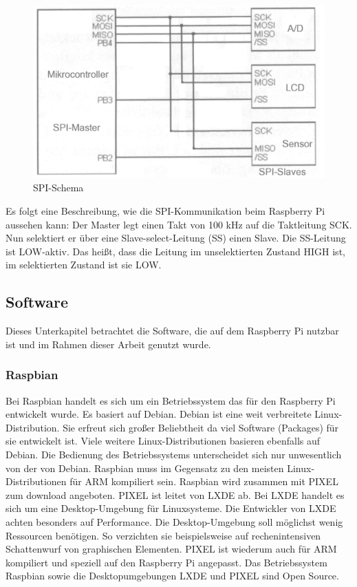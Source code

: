 \begin{figure}[h!] 
\includegraphics[scale=0.3]{bilder/spi}
\caption[SPI Schema]{SPI-Schema \cite{dembowski2015raspberry}}
\label{spi}
\end{figure}

Es folgt eine Beschreibung, wie die \ac{SPI}-Kommunikation beim Raspberry Pi aussehen kann: Der Master legt einen Takt von 100 kHz auf die Taktleitung SCK. Nun selektiert er über eine Slave-select-Leitung (SS) einen Slave. Die SS-Leitung ist LOW-aktiv. Das heißt, dass die Leitung im unselektierten Zustand HIGH ist, im selektierten Zustand ist sie LOW. 

 \cite{dembowski2015raspberry} \cite{lehmann}

 
\subsection{Software}
Dieses Unterkapitel betrachtet die Software, die auf dem Raspberry Pi nutzbar ist und im Rahmen dieser Arbeit genutzt wurde.
\subsubsection{Raspbian}
Bei Raspbian handelt es sich um ein Betriebssystem das für den Raspberry Pi entwickelt wurde. Es basiert auf Debian. Debian ist eine weit verbreitete Linux-Distribution. Sie erfreut sich großer Beliebtheit da viel Software (Packages) für sie entwickelt ist. Viele weitere Linux-Distributionen basieren ebenfalls auf Debian. Die Bedienung des Betriebssystems unterscheidet sich nur unwesentlich von der von Debian. Raspbian muss im Gegensatz zu den meisten Linux-Distributionen für ARM kompiliert sein. 
Raspbian wird zusammen mit \ac{PIXEL} zum download angeboten. \ac{PIXEL} ist leitet von \ac{LXDE} ab. Bei \ac{LXDE} handelt es sich um eine Desktop-Umgebung für Linuxsysteme. Die Entwickler von \ac{LXDE} achten besonders auf Performance. Die Desktop-Umgebung soll möglichst wenig Ressourcen benötigen. So verzichten sie beispielsweise auf rechenintensiven Schattenwurf von graphischen Elementen. \ac{PIXEL} ist wiederum auch für ARM kompiliert und speziell auf den Raspberry Pi angepasst. Das Betriebssystem Raspbian sowie die Desktopumgebungen \ac{LXDE} und \ac{PIXEL} sind Open Source.

